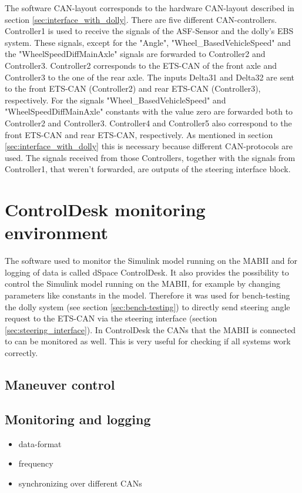 \documentclass[ExampleMasters.tex]{subfiles}
\begin{document}
 The software CAN-layout corresponds to the hardware CAN-layout described in section \ref{sec:interface_with_dolly}. There are five different CAN-controllers. Controller1 is used to receive the signals of the ASF-Sensor and the dolly's EBS system. These signals, except for the "Angle", "Wheel\_BasedVehicleSpeed" and the "WheelSpeedDiffMainAxle" signals are forwarded to Controller2 and Controller3. Controller2 corresponds to the ETS-CAN of the front axle and Controller3 to the one of the rear axle. The inputs Delta31 and Delta32 are sent to the front ETS-CAN (Controller2) and rear ETS-CAN (Controller3), respectively. For the signals "Wheel\_BasedVehicleSpeed" and  "WheelSpeedDiffMainAxle" constants with the value zero are forwarded both to Controller2 and Controller3.
 Controller4 and Controller5 also correspond to the front ETS-CAN and rear ETS-CAN, respectively. As mentioned in section \ref{sec:interface_with_dolly} this is necessary because different CAN-protocols are used. The signals received from those Controllers, together with the signals from Controller1, that weren't forwarded, are outputs of the steering interface block.
  
\section{ControlDesk monitoring environment}
\label{sec:control_desk}
The software used to monitor the Simulink model running on the MABII and for logging of data is called dSpace ControlDesk. It also provides the possibility to control the Simulink model running on the MABII, for example by changing parameters like constants in the model. Therefore it was used for bench-testing the dolly system (see section \ref{sec:bench-testing}) to directly send steering angle request to the ETS-CAN via the steering interface (section \ref{sec:steering_interface}). In ControlDesk the CANs that the MABII is connected to can be monitored as well. This is very useful for checking if all systems work correctly. 
\subsection{Maneuver control}


\subsection{Monitoring and logging}
\begin{itemize}
	\item data-format
	\item frequency
	\item synchronizing over different CANs	
\end{itemize}
\end{document}
